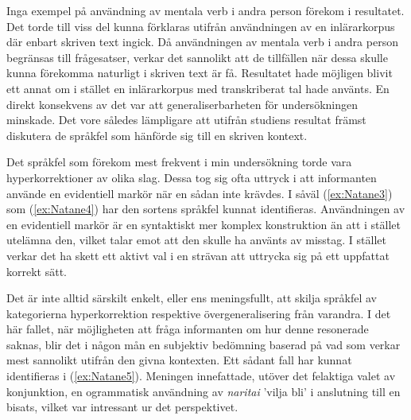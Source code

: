 \documentclass[12pt,a4paper]{article}
\begin{document}
Inga exempel på användning av mentala verb i andra person förekom i resultatet. Det torde till viss del kunna förklaras utifrån användningen av en inlärarkorpus där enbart skriven text ingick. Då användningen av mentala verb i andra person begränsas till frågesatser, verkar det sannolikt att de tillfällen när dessa skulle kunna förekomma naturligt i skriven text är få. Resultatet hade möjligen blivit ett annat om i stället en inlärarkorpus med transkriberat tal hade använts. En direkt konsekvens av det var att generaliserbarheten för undersökningen minskade. Det vore således lämpligare att utifrån studiens resultat främst diskutera de språkfel som hänförde sig till en skriven kontext.

Det språkfel som förekom mest frekvent i min undersökning torde vara hyperkorrektioner av olika slag. Dessa tog sig ofta uttryck i att informanten använde en evidentiell markör när en sådan inte krävdes. I såväl (\ref{ex:Natane3}) som (\ref{ex:Natane4}) har den sortens språkfel kunnat identifieras. Användningen av en evidentiell markör är en syntaktiskt mer komplex konstruktion än att i stället utelämna den, vilket talar emot att den skulle ha använts av misstag. I stället verkar det ha skett ett aktivt val i en strävan att uttrycka sig på ett uppfattat korrekt sätt.

\begin{exe}
\end{exe}

\begin{exe}
\end{exe}

Det är inte alltid särskilt enkelt, eller ens meningsfullt, att skilja språkfel av kategorierna hyperkorrektion respektive övergeneralisering från varandra. I det här fallet, när möjligheten att fråga informanten om hur denne resonerade saknas, blir det i någon mån en subjektiv bedömning baserad på vad som verkar mest sannolikt utifrån den givna kontexten. Ett sådant fall har kunnat identifieras i (\ref{ex:Natane5}). Meningen innefattade, utöver det felaktiga valet av konjunktion, en ogrammatisk användning av \emph{naritai} 'vilja bli' i anslutning till en bisats, vilket var intressant ur det perspektivet.
\end{document}
